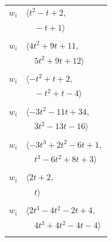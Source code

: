 \documentclass[11pt]{article}
\begin{document}
\begin{longtable}{@{}ll@{}}
$w_i$ & $\langle t^{2}-t+2,$\\
 & $\quad -t+1\rangle$\\
\addlinespace[2pt]
\multicolumn{2}{@{}p{0.97\textwidth}@{}}{$i=13$, $D_i=1$, $\rho_{ij}$: $19{:}1, \allowbreak 21{:}1, \allowbreak 24{:}1, \allowbreak 29{:}1, \allowbreak 34{:}2, \allowbreak 36{:}1, \allowbreak 39{:}2, \allowbreak 44{:}2$}\\
$w_i$ & $\langle 4t^{2}+9t+11,$\\
 & $\quad 5t^{2}+9t+12\rangle$\\
\addlinespace[2pt]
\multicolumn{2}{@{}p{0.97\textwidth}@{}}{$i=14$, $D_i=1$, $\rho_{ij}$: $20{:}1, \allowbreak 26{:}2, \allowbreak 29{:}2, \allowbreak 34{:}2, \allowbreak 39{:}1$}\\
$w_i$ & $\langle -t^{2}+t+2,$\\
 & $\quad -t^{2}+t-4\rangle$\\
\addlinespace[2pt]
\multicolumn{2}{@{}p{0.97\textwidth}@{}}{$i=15$, $D_i=1$, $\rho_{ij}$: $19{:}1, \allowbreak 20{:}1, \allowbreak 23{:}1, \allowbreak 25{:}2, \allowbreak 28{:}1, \allowbreak 34{:}2, \allowbreak 45{:}1$}\\
$w_i$ & $\langle -3t^{2}-11t+34,$\\
 & $\quad 3t^{2}-13t-16\rangle$\\
\addlinespace[2pt]
\multicolumn{2}{@{}p{0.97\textwidth}@{}}{$i=16$, $D_i=1$, $\rho_{ij}$: $7{:}1, \allowbreak 9{:}2, \allowbreak 22{:}1, \allowbreak 24{:}1, \allowbreak 25{:}2, \allowbreak 30{:}2, \allowbreak 36{:}2, \allowbreak 39{:}1$}\\
$w_i$ & $\langle -3t^{3}+2t^{2}-6t+1,$\\
 & $\quad t^{3}-6t^{2}+8t+3\rangle$\\
\addlinespace[2pt]
\multicolumn{2}{@{}p{0.97\textwidth}@{}}{$i=17$, $D_i=1$, $\rho_{ij}$: $21{:}1, \allowbreak 44{:}2, \allowbreak 46{:}2$}\\
$w_i$ & $\langle 2t+2,$\\
 & $\quad t\rangle$\\
\addlinespace[2pt]
\multicolumn{2}{@{}p{0.97\textwidth}@{}}{$i=18$, $D_i=1$, $\rho_{ij}$: $3{:}1, \allowbreak 11{:}1, \allowbreak 21{:}1, \allowbreak 40{:}2, \allowbreak 44{:}2$}\\
$w_i$ & $\langle 2t^{3}-4t^{2}-2t+4,$\\
 & $\quad 4t^{3}+4t^{2}-4t-4\rangle$\\
\addlinespace[2pt]
\multicolumn{2}{@{}p{0.97\textwidth}@{}}{$i=19$, $D_i=1$, $\rho_{ij}$: $7{:}2, \allowbreak 10{:}2, \allowbreak 12{:}1, \allowbreak 13{:}2, \allowbreak 15{:}2, \allowbreak 23{:}1, \allowbreak 34{:}2, \allowbreak 41{:}1, \allowbreak 42{:}2, \allowbreak 43{:}2, \allowbreak 45{:}2$}\\

\end{longtable}
\end{document}
